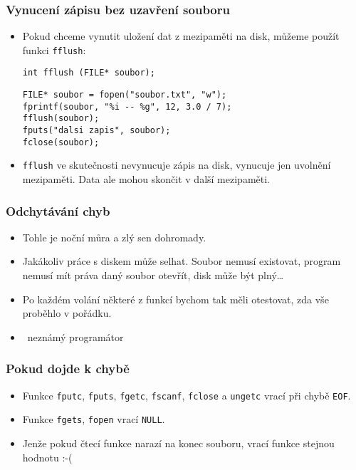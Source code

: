 \documentclass{beamer}
\newenvironment{itemizex}%
  {\large \begin{itemize}%
    \setlength{\itemsep}{8pt}%
    \setlength{\parskip}{8pt}}%
  {\end{itemize}}
\begin{document}
\begin{frame}[t,fragile]\frametitle{Vynucení zápisu bez uzavření souboru} 
    \begin{itemizex}
        \item Pokud chceme vynutit uložení dat z mezipaměti na disk, můžeme použít funkci \texttt{fflush}:
\begin{verbatim} 
int fflush (FILE* soubor);
\end{verbatim}

\begin{verbatim} 
FILE* soubor = fopen("soubor.txt", "w");
fprintf(soubor, "%i -- %g", 12, 3.0 / 7);
fflush(soubor);
fputs("dalsi zapis", soubor);
fclose(soubor);
\end{verbatim}
        \item \texttt{fflush} ve skutečnosti nevynucuje zápis na disk, vynucuje jen uvolnění mezipaměti. Data ale mohou skončit v další mezipaměti. 
    \end{itemizex}
\end{frame}


\begin{frame}[t,fragile]\frametitle{Odchytávání chyb} 
    \begin{itemizex}
        \item Tohle je noční můra a zlý sen dohromady. 
        \item Jakákoliv práce s diskem může selhat. Soubor nemusí existovat, program nemusí mít práva daný soubor otevřít, disk může být plný\dots
        \item Po každém volání některé z funkcí bychom tak měli otestovat, zda vše proběhlo v pořádku. 
        \item {} ~neznámý programátor
    \end{itemizex}
\end{frame}


\begin{frame}[t,fragile]\frametitle{Pokud dojde k chybě} 
    \begin{itemizex}
        \item Funkce \texttt{fputc}, \texttt{fputs}, \texttt{fgetc}, \texttt{fscanf}, \texttt{fclose} a \texttt{ungetc} vrací při chybě \texttt{EOF}.
        \item Funkce \texttt{fgets}, \texttt{fopen} vrací \texttt{NULL}.
        \item Jenže pokud čtecí funkce narazí na konec souboru, vrací funkce stejnou hodnotu :-(
    \end{itemizex}
\end{frame}
\end{document}
